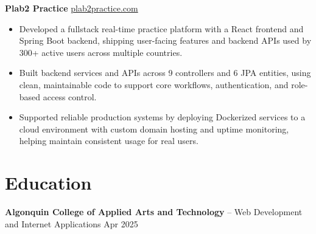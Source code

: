 \documentclass[11pt]{article}       %
\begin{document}
\textbf{Plab2 Practice} \hfill \href{https://plab2practice.com}{plab2practice.com} \\
\vspace{-9pt}
\begin{itemize}
  \item Developed a fullstack real-time practice platform with a React frontend and Spring Boot backend, shipping user-facing features and backend APIs used by 300+ active users across multiple countries.
  \item Built backend services and APIs across 9 controllers and 6 JPA entities, using clean, maintainable code to support core workflows, authentication, and role-based access control.
  \item Supported reliable production systems by deploying Dockerized services to a cloud environment with custom domain hosting and uptime monitoring, helping maintain consistent usage for real users.
\end{itemize}





\section*{Education}
\textbf{Algonquin College of Applied Arts and Technology} -- Web Development and Internet Applications
\hfill Apr 2025 \\
\end{document}
